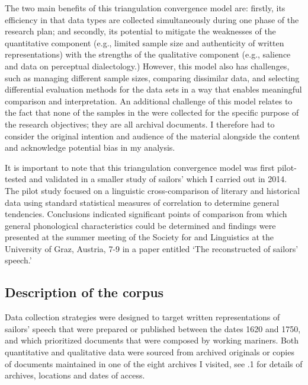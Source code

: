 The two main benefits of this triangulation convergence model are: firstly, its efficiency in that data types are collected simultaneously during one phase of the research plan; and secondly, its potential to mitigate the weaknesses of the quantitative component (e.g., limited sample size and authenticity of written representations) with the strengths of the qualitative component (e.g., salience and data on perceptual dialectology.) However, this model also has challenges, such as managing different sample sizes, comparing dissimilar data, and selecting differential evaluation methods for the data sets in a way that enables meaningful comparison and interpretation. An additional challenge of this model relates to the fact that none of the samples in the  were collected for the specific purpose of the research objectives; they are all archival documents. I therefore had to consider the original intention and audience of the material alongside the content and acknowledge potential bias in my analysis. 



It is important to note that this triangulation convergence model was first pilot-tested and validated in a smaller study of sailors’  which I carried out in 2014. The pilot study focused on a linguistic cross-comparison of literary and historical data using standard statistical measures of correlation to determine general tendencies. Conclusions indicated significant points of comparison from which general phonological characteristics could be determined and findings were presented at the summer meeting of the Society for  and  Linguistics at the University of Graz, Austria, 7-9 \citealt{July2015} in a paper entitled ‘The reconstructed  of  sailors’ speech.’



\subsection{{Description} {of} {the} {corpus}}%



Data collection strategies were designed to target written representations of sailors’ speech that were prepared or published between the dates 1620 and 1750, and which prioritized documents that were composed by working mariners. Both quantitative and qualitative data were sourced from archived originals or copies of documents maintained in one of the eight archives I visited, see .1 for details of archives, locations and dates of access.


